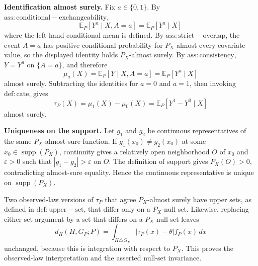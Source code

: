 \textbf{Identification almost surely.} Fix \(a\in\{0,1\}\). By \(\mathrm{ass:conditional-exchangeability}\),
\[
\mathbb E_P[Y^a\mid X,A=a]=\mathbb E_P[Y^a\mid X]
\]
where the left-hand conditional mean is defined. By \(\mathrm{ass:strict-overlap}\), the event \(A=a\) has positive conditional probability for \(P_X\)-almost every covariate value, so the displayed identity holds \(P_X\)-almost surely. By \(\mathrm{ass:consistency}\), \(Y=Y^a\) on \(\{A=a\}\), and therefore
\[
\mu_a(X)=\mathbb E_P[Y\mid X,A=a]=\mathbb E_P[Y^a\mid X]
\]
almost surely. Subtracting the identities for \(a=0\) and \(a=1\), then invoking \(\mathrm{def:cate}\), gives
\[
\tau_P(X)=\mu_1(X)-\mu_0(X)=\mathbb E_P[Y^1-Y^0\mid X]
\]
almost surely.

\textbf{Uniqueness on the support.} Let \(g_1\) and \(g_2\) be continuous representatives of the same \(P_X\)-almost-sure function. If \(g_1(x_0)\ne g_2(x_0)\) at some \(x_0\in\operatorname{supp}(P_X)\), continuity gives a relatively open neighborhood \(O\) of \(x_0\) and \(\varepsilon>0\) such that \(|g_1-g_2|>\varepsilon\) on \(O\). The definition of support gives \(P_X(O)>0\), contradicting almost-sure equality. Hence the continuous representative is unique on \(\operatorname{supp}(P_X)\).

Two observed-law versions of \(\tau_P\) that agree \(P_X\)-almost surely have upper sets, as defined in \(\mathrm{def:upper-set}\), that differ only on a \(P_X\)-null set. Likewise, replacing either set argument by a set that differs on a \(P_X\)-null set leaves
\[
d_H(H,G_P;P)=\int_{H\triangle G_P}|\tau_P(x)-\theta|f_P(x)\,dx
\]
unchanged, because this is integration with respect to \(P_X\). This proves the observed-law interpretation and the asserted null-set invariance.